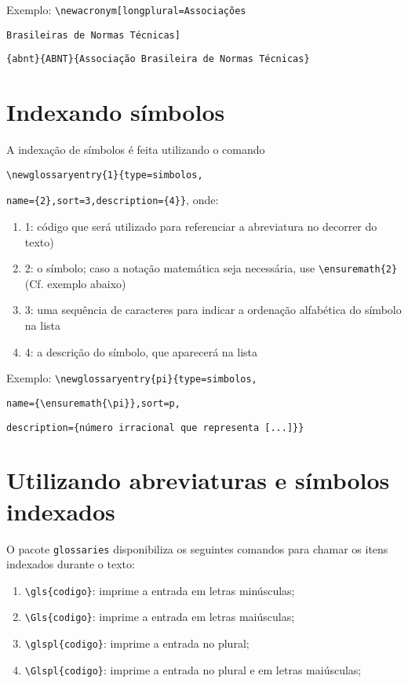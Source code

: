 \documentclass{fei}
\begin{document}
	Exemplo: \verb+\newacronym[longplural=Associações+
	
			 \verb+Brasileiras de Normas Técnicas]+
			 
			 \verb+{abnt}{ABNT}{Associação Brasileira de Normas Técnicas}+
			 
	\section{Indexando símbolos}
	
	A indexação de símbolos é feita utilizando o comando
	
	\verb+\newglossaryentry{1}{type=simbolos,+
	
	\verb+name={2},sort=3,description={4}}+, onde:
	
	\begin{enumerate}
	\item 1: código que será utilizado para referenciar a abreviatura no decorrer do texto)
	\item 2: o símbolo; caso a notação matemática seja necessária, use \verb+\ensuremath{2}+ (Cf. exemplo abaixo)
	\item 3: uma sequência de caracteres para indicar a ordenação alfabética do símbolo na lista
	\item 4: a descrição do símbolo, que aparecerá na lista
	\end{enumerate}
	
	Exemplo: \verb+\newglossaryentry{pi}{type=simbolos,+
	
			 \verb+name={\ensuremath{\pi}},sort=p,+
			 
			 \verb+description={número irracional que representa [...]}}+

	\section{Utilizando abreviaturas e símbolos indexados}
	
	O pacote \verb+glossaries+ disponibiliza os seguintes comandos para chamar os itens indexados durante o texto:
	
	\begin{enumerate}
	\item \verb+\gls{codigo}+: imprime a entrada em letras minúsculas;
	\item \verb+\Gls{codigo}+: imprime a entrada em letras maiúsculas;
	\item \verb+\glspl{codigo}+: imprime a entrada no plural;
	\item \verb+\Glspl{codigo}+: imprime a entrada no plural e em letras maiúsculas;
	\end{enumerate}
	
\end{document}

